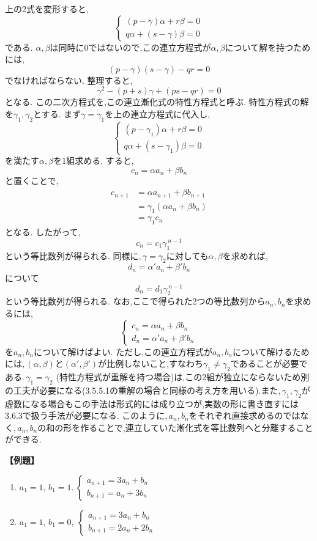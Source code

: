     上の2式を変形すると,
    \[
    \begin{cases}
      (p-\gamma)\alpha+r\beta=0\\
      q\alpha+(s-\gamma)\beta=0
    \end{cases}
    \]
    である.
    $\alpha,\beta$は同時に$0$ではないので,この連立方程式が$\alpha,\beta$について解を持つためには,
    \[
      (p-\gamma)(s-\gamma)-qr=0
    \]
    でなければならない.
    整理すると,
    \[
      \gamma^2-(p+s)\gamma+(ps-qr)=0
    \]
    となる.
    この二次方程式を,この連立漸化式の特性方程式と呼ぶ.
    特性方程式の解を$\gamma_1,\gamma_2$とする.
    まず$\gamma=\gamma_1$を上の連立方程式に代入し,
    \[
      \begin{cases}
        (p-\gamma_1)\alpha+r\beta=0\\
        q\alpha+(s-\gamma_1)\beta=0
      \end{cases}
    \]
    を満たす$\alpha,\beta$を1組求める.
    すると,
    \[
      c_n=\alpha a_n+\beta b_n
    \]
    と置くことで,
    \begin{align*}
      c_{n+1}&=\alpha a_{n+1}+\beta b_{n+1}\\
      &=\gamma_1(\alpha a_n+\beta b_n)\\
      &=\gamma_1c_n
    \end{align*}
    となる.
    したがって,
    \[
      c_n=c_1\gamma_1^{\,n-1}
    \]
    という等比数列が得られる.
    同様に,\,$\gamma=\gamma_2$に対しても$\alpha,\beta$を求めれば,
    \[
      d_n=\alpha' a_n+\beta' b_n
    \]
    について
    \[
      d_n=d_1\gamma_2^{\,n-1}
    \]
    という等比数列が得られる.
    なお,ここで得られた2つの等比数列から$a_n,b_n$を求めるには,
    \[
      \begin{cases}
      c_n=\alpha a_n+\beta b_n\\
      d_n=\alpha'a_n+\beta'b_n
      \end{cases}
    \]
    を$a_n,b_n$について解けばよい.
    ただし,この連立方程式が$a_n,b_n$について解けるためには,\,$(\alpha,\beta)$と$(\alpha',\beta')$が比例しないこと,すなわち$\gamma_1\ne\gamma_2$であることが必要である.$\,\gamma_1=\gamma_2$ (特性方程式が重解を持つ場合)は,この2組が独立にならないため別の工夫が必要になる(3.5.5.1の重解の場合と同様の考え方を用いる).また,$\,\gamma_1,\gamma_2$が虚数になる場合もこの手法は形式的には成り立つが,実数の形に書き直すには3.6.3で扱う手法が必要になる.
    このように,\,$a_n,b_n$をそれぞれ直接求めるのではなく,\,$a_n,b_n$の和の形を作ることで,連立していた漸化式を等比数列へと分離することができる.

    \noindent \textbf{【例題】}
    \begin{enumerate}[label=(\arabic*),parsep=3pt]
      \item $\displaystyle a_1=1,\,b_1=1.\ \begin{cases}a_{n+1}=3a_n+b_n\\ b_{n+1}=a_n+3b_n\end{cases}$
      \item $\displaystyle a_1=1,\,b_1=0,\ \begin{cases}a_{n+1}=3a_n+b_n\\ b_{n+1}=2a_n+2b_n\end{cases}$
    \end{enumerate}

